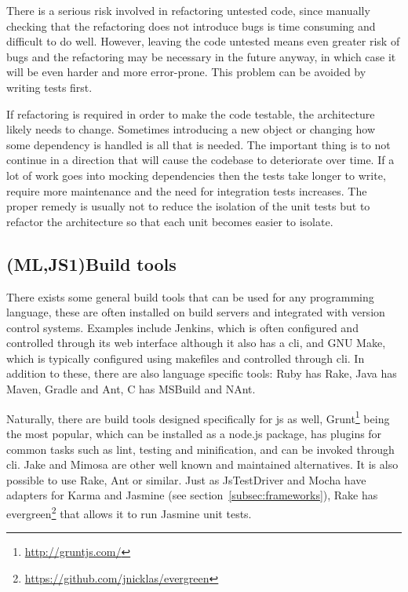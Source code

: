 \documentclass[11pt]{article}
\begin{document}
There is a serious risk involved in refactoring untested code\cite[p.~17]{Refactoring}, since manually checking that the refactoring does not introduce bugs is time consuming and difficult to do well. However, leaving the code untested means even greater risk of bugs and the refactoring may be necessary in the future anyway, in which case it will be even harder and more error-prone. This problem can be avoided by writing tests first.

If refactoring is required in order to make the code testable, the architecture likely needs to change. Sometimes introducing a new object or changing how some dependency is handled is all that is needed. The important thing is to not continue in a direction that will cause the codebase to deteriorate over time. \cite[question~34]{Stenmark} If a lot of work goes into mocking dependencies then the tests take longer to write, require more maintenance and the need for integration tests increases. The proper remedy is usually not to reduce the isolation of the unit tests but to refactor the architecture so that each unit becomes easier to isolate. \cite[question~42]{Stenmark}

\subsection{(ML,JS1)Build tools}
\label{subsec:build}

There exists some general build tools that can be used for any programming language, these are often installed on build servers and integrated with version control systems. Examples include Jenkins, which is often configured and controlled through its web interface although it also has a \gls{cli}, and GNU Make, which is typically configured using makefiles and controlled through \gls{cli}. In addition to these, there are also language specific tools: Ruby has Rake, Java has Maven, Gradle and Ant, C\nolinebreak\hspace{-.05em}\raisebox{.3ex}{\scriptsize\bf \#} has MSBuild and NAnt.

Naturally, there are build tools designed specifically for \gls{js} as well, Grunt\footnote{\url{http://gruntjs.com/}} being the most popular, which can be installed as a node.js package, has plugins for common tasks such as lint, testing and minification, and can be invoked through \gls{cli}. \cite[question~52]{Edelstam} Jake and Mimosa are other well known and maintained alternatives. It is also possible to use Rake, Ant or similar. Just as JsTestDriver and Mocha have adapters for Karma and Jasmine (see section~\ref{subsec:frameworks}), Rake has evergreen\footnote{\url{https://github.com/jnicklas/evergreen}} that allows it to run Jasmine unit tests. \cite{BuildTools}\cite[question~6]{Ahnve}
\end{document}
